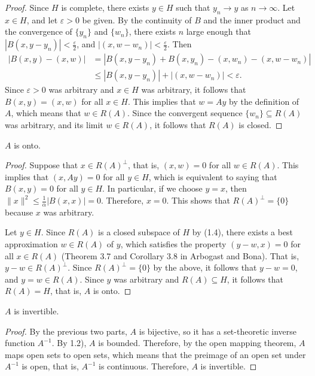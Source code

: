 \documentclass{homework}
\begin{document}
\begin{arabicparts}
\begin{proof}
			Since $H$ is complete, there exists $y \in H$ such that $y_n \to y$ as $n \to \infty$. Let $x \in H$, and let $\varepsilon > 0$ be given. By the continuity of $B$ and the inner product and the convergence of $\{y_n\}$ and $\{w_n\}$, there exists $n$ large enough that $|B(x,y-y_n)| < \frac{\varepsilon}{2}$, and $|(x,w-w_n)| < \frac{\varepsilon}{2}$. Then
			\begin{equation}
			\begin{aligned}
				|B(x,y) - (x,w)| &= |B(x,y-y_n) + B(x,y_n) - (x,w_n) -(x,w-w_n)| \\
				&\le |B(x,y-y_n)| + |(x,w-w_n)| < \varepsilon.
			\end{aligned}
			\end{equation}
			Since $\varepsilon> 0$ was arbitrary and $x \in H$ was arbitrary, it follows that $B(x,y) = (x,w)$ for all $x \in H$. This implies that $w = Ay$ by the definition of $A$, which means that $w \in R(A)$. Since the convergent sequence $\{w_n\}\subseteq R(A)$ was arbitrary, and its limit $w \in R(A)$, it follows that $R(A)$ is closed.
		\end{proof}
		
		\questionpart
		$A$ is onto.
		\begin{proof}
			Suppose that $x \in R(A)^\perp$, that is, $(x, w) = 0$ for all $w \in R(A)$. This implies that $(x, Ay) = 0$ for all $y \in H$, which is equivalent to saying that $B(x, y) = 0$ for all $y \in H$. In particular, if we choose $y = x$, then $\lVert x\rVert^2 \le \frac{1}{\alpha}|B(x, x)| = 0$. Therefore, $x = 0$. This shows that $R(A)^\perp = \{0\}$ because $x$ was arbitrary. 
			
			Let $y \in H$. Since $R(A)$ is a closed subspace of $H$ by (1.4), there exists a best approximation $w \in R(A)$ of $y$, which satisfies the property $(y - w, x) = 0$ for all $x \in R(A)$ (Theorem 3.7 and Corollary 3.8 in Arbogast and Bona). That is, $y-w \in R(A)^\perp$. Since $R(A)^\perp =\{0\}$ by the above, it follows that $y-w = 0$, and $y=w \in R(A)$. Since $y$ was arbitrary and $R(A) \subseteq H$, it follows that $R(A) = H$, that is, $A$  is onto.
		\end{proof}
		
		\questionpart
		$A$ is invertible.
		\begin{proof}
			By the previous two parts, $A$ is bijective, so it has a set-theoretic inverse function $A^{-1}$. By 1.2), $A$ is bounded. Therefore, by the open mapping theorem, $A$ maps open sets to open sets, which means that the preimage of an open set under $A^{-1}$ is open, that is, $A^{-1}$ is continuous. Therefore, $A$ is invertible.
		\end{proof}
		

\end{arabicparts}
\end{document}
